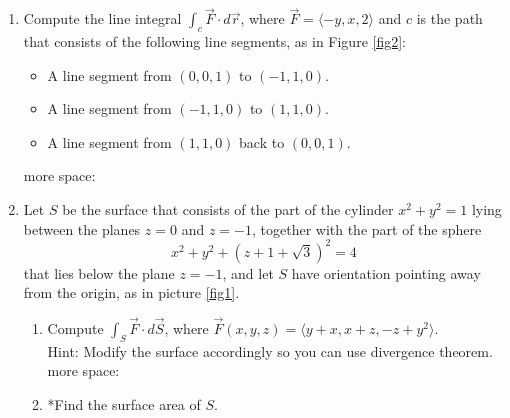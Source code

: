 \documentclass[12pt]{article}
\newcommand{\vr}{\vec{r}{}}
\newcommand{\vF}{\vec{F}}
\renewcommand{\lg}{\langle}
\newcommand{\rg}{\rangle}
\newcommand{\n}{\nabla}
\newcommand{\Fline}{\vF\cdot d\vr}
\let \div\undefined
\DeclareMathOperator{\div}{div}
\begin{document}
\begin{enumerate}

\vfill

\newpage 
\item Compute the line integral $\int_c \Fline$, where $\vF=\lg -y,x,2\rg$ and $c$ is the path that consists of the following line segments, as in Figure \ref{fig2}:
\begin{itemize}
\item A line segment from $(0,0,1)$ to $(-1,1,0)$.
\item A line segment from $(-1,1,0)$ to $(1,1,0)$.
\item A line segment from $(1,1,0)$  back to $(0,0,1)$.
\end{itemize}

\vfill
\newpage
more space:
\newpage
\item Let $S$ be the surface that consists of the part of the cylinder $x^2+y^2=1$ lying between the planes $z=0$ and $z=-1$, together with the part of the sphere $$x^2+y^2+(z+1+\sqrt{3})^2=4$$ that lies below the plane $z=-1$, and let $S$ have orientation pointing away from the origin, as in picture \ref{fig1}. 

\begin{enumerate}
\item Compute $\int_S \vF\cdot d\vec{S}$, where $\vF(x,y,z)=\langle y+x, x+z,-z+y^2\rangle$.\\
 Hint: Modify the surface accordingly so you can use divergence theorem.
\newpage
more space:
\newpage
\item *Find the surface area of $S$.
\end{enumerate}




\end{enumerate}
\end{document}
